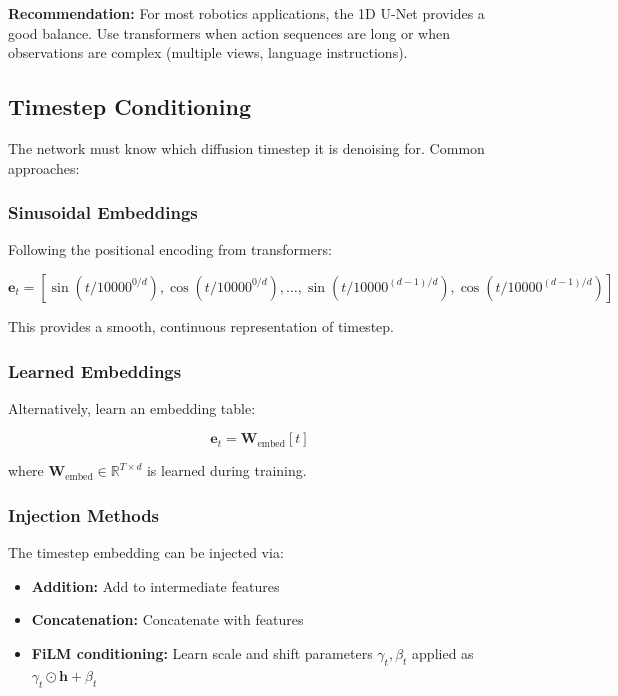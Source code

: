 \textbf{Recommendation:} For most robotics applications, the 1D U-Net provides a good balance. Use transformers when action sequences are long or when observations are complex (multiple views, language instructions).

\subsection{Timestep Conditioning}
\label{subsec:timestep_conditioning}

The network must know which diffusion timestep it is denoising for. Common approaches:

\subsubsection{Sinusoidal Embeddings}

Following the positional encoding from transformers:

\begin{equation}
\mathbf{e}_t = [\sin(t/10000^{0/d}), \cos(t/10000^{0/d}), \ldots, \sin(t/10000^{(d-1)/d}), \cos(t/10000^{(d-1)/d})]
\label{eq:sinusoidal_embedding}
\end{equation}

This provides a smooth, continuous representation of timestep.

\subsubsection{Learned Embeddings}

Alternatively, learn an embedding table:

\begin{equation}
\mathbf{e}_t = \mathbf{W}_{\text{embed}}[t]
\label{eq:learned_embedding}
\end{equation}

where $\mathbf{W}_{\text{embed}} \in \mathbb{R}^{T \times d}$ is learned during training.

\subsubsection{Injection Methods}

The timestep embedding can be injected via:
\begin{itemize}
    \item \textbf{Addition:} Add to intermediate features
    \item \textbf{Concatenation:} Concatenate with features
    \item \textbf{FiLM conditioning:} Learn scale and shift parameters $\gamma_t, \beta_t$ applied as $\gamma_t \odot \mathbf{h} + \beta_t$
\end{itemize}

